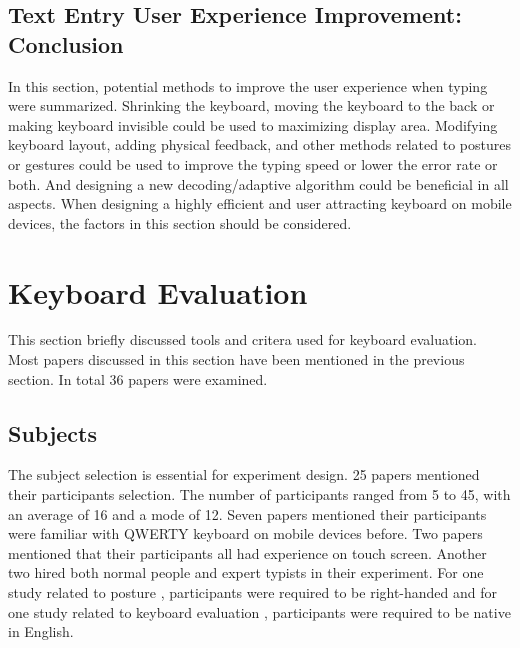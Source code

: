 \documentclass[11pt]{article}
\begin{document}
\subsection{Text Entry User Experience Improvement: Conclusion}
In this section, potential methods to improve the user experience when typing were summarized. Shrinking the keyboard, moving the keyboard to the back or making keyboard invisible could be used to maximizing display area. Modifying keyboard layout, adding physical feedback, and other methods related to postures or gestures could be used to improve the typing speed or lower the error rate or both. And designing a new decoding/adaptive algorithm could be beneficial in all aspects. When designing a highly efficient and user attracting keyboard on mobile devices, the factors in this section should be considered.

\section{Keyboard Evaluation}\label{section-evaluation}
This section briefly discussed tools and critera used for keyboard evaluation. Most papers discussed in this section have been mentioned in the previous section. In total 36 papers were examined.

\subsection{Subjects}
The subject selection is essential for experiment design. 25 papers mentioned their participants selection. The number of participants ranged from 5 to 45, with an average of 16 and a mode of 12. Seven papers mentioned their participants were familiar with QWERTY keyboard on mobile devices before. Two papers \citep{10.1145/3173574.3174013, 10.1145/2371574.2371612} mentioned that their participants all had experience on touch screen. Another two \citep{10.1145/2037373.2037440, 10.1145/1978942.1979301} hired both normal people and expert typists in their experiment. For one study related to posture \citep{10.1016/j.ijhcs.2008.03.004}, participants were required to be right-handed and for one study related to keyboard evaluation \citep{10.1145/2702123.2702273}, participants were required to be native in English.
\end{document}
